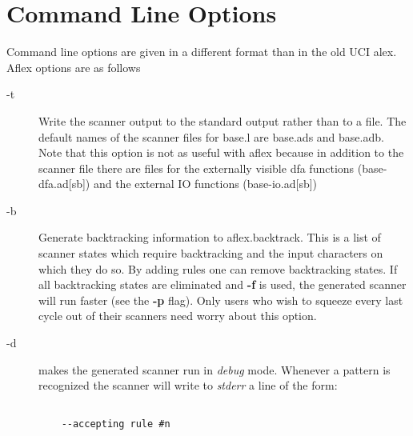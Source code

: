 \newpage
\section{Command Line Options}
Command line options are given in a different format than in the
old UCI alex.  Aflex options are as follows
\begin{description}
\item[-t]
Write the scanner output to the standard output rather than to a file.
The default names of the scanner files for base.l are base.ads and base.adb.
Note that this option is not as useful with aflex because in addition 
to the scanner file there are files for the externally visible dfa functions
(base-dfa.ad[sb]) and the external IO functions (base-io.ad[sb])
\item[-b]
Generate backtracking information to
{\it} aflex.backtrack.
This is a list of scanner states which require backtracking
and the input characters on which they do so.  By adding rules one
can remove backtracking states.  If all backtracking states
are eliminated and
{\bf -f}
is used, the generated scanner will run faster (see the
{\bf -p}
flag).  Only users who wish to squeeze every last cycle out of their
scanners need worry about this option.
\item[-d]
makes the generated scanner run in
{\it debug}
mode.  Whenever a pattern is recognized the scanner will
write to
{\it stderr}
a line of the form:
\begin{verbatim}

    --accepting rule #n


\end{verbatim}
\end{description}
